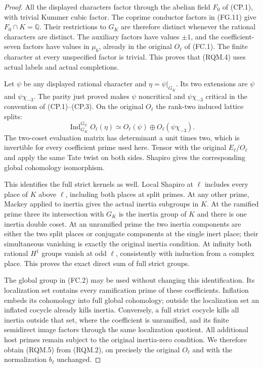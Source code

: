 \begin{proof}
All the displayed characters factor through the abelian field
$F_0$ of (CP.1), with trivial Kummer cubic factor. The coprime
conductor factors in (FG.11) give $F_0\cap K=\mathbb Q$.
Their restrictions to $G_K$ are therefore distinct whenever
the rational characters are distinct. The auxiliary factors
have values $\pm1$, and the coefficient-seven factors have
values in $\mu_6$, already in the original $O_\ell$ of (FC.1).
The finite character at every unspecified factor is trivial.
This proves that (RQM.4) uses actual labels and actual completions.

Let $\psi$ be any displayed rational character and
$\eta=\psi|_{G_K}$. Its two extensions are $\psi$ and
$\psi\chi_{-3}$. The parity just proved makes $\psi$ noncritical
and $\psi\chi_{-3}$ critical in the convention of (CP.1)--(CP.3).
On the original $O_\ell$ the rank-two induced lattice splits:
\[
 \operatorname{Ind}_{G_K}^{G_{\mathbb Q}}O_\ell(\eta)
        \simeq O_\ell(\psi)\oplus O_\ell(\psi\chi_{-3}).
 \tag{RQM.12}
\]
The two-coset evaluation matrix has determinant a unit times two,
which is invertible for every coefficient prime used here.
Tensor with the original $E_\ell/O_\ell$ and apply the same Tate
twist on both sides. Shapiro gives the corresponding global
cohomology isomorphism.

This identifies the full strict kernels as well.
Local Shapiro at $\ell$ includes every place of $K$ above $\ell$,
including both places at split primes. At any other prime,
Mackey applied to inertia gives the actual inertia subgroups in
$K$. At the ramified prime three its intersection with $G_K$
is the inertia group of $K$ and there is one inertia double coset.
At an unramified prime the two inertia components are either
the two split places or conjugate components at the single inert
place; their simultaneous vanishing is exactly the original
inertia condition. At infinity both rational $H^1$ groups vanish
at odd $\ell$, consistently with induction from a complex place.
This proves the exact direct sum of full strict groups.

The global group in (FC.2) may be used without changing this
identification. Its localization set contains every ramification
prime of these coefficients. Inflation embeds its cohomology
into full global cohomology; outside the localization set an
inflated cocycle already kills inertia. Conversely, a full strict
cocycle kills all inertia outside that set, where the coefficient
is unramified, and its finite semidirect image factors through
the same localization quotient. All additional host primes
remain subject to the original inertia-zero condition.
We therefore obtain (RQM.5) from (RQM.2), on precisely the
original $O_\ell$ and with the normalization $b_\ell$ unchanged.


\end{proof}
